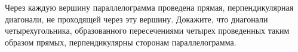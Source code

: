 \begin{ex}
	\begin{condition}
		Через каждую вершину параллелограмма проведена	прямая, перпендикулярная диагонали, не проходящей через эту	вершину. Докажите, что диагонали четырехугольника, образованного пересечениями четырех проведенных таким образом прямых, перпендикулярны сторонам параллелограмма.
	\end{condition}
\end{ex}